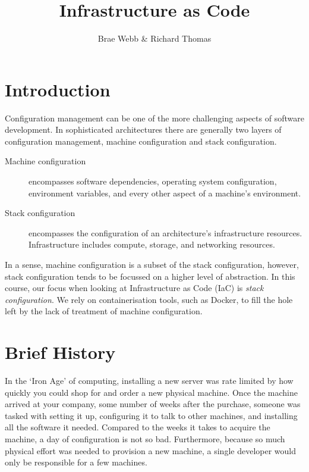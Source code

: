 \title{Infrastructure as Code}
\author{Brae Webb \& Richard Thomas}
\date{}

\maketitle

\section{Introduction}
Configuration management can be one of the more challenging aspects of software development.
In sophisticated architectures there are generally two layers of configuration management,
machine configuration and stack configuration.

\begin{description}
    \item[Machine configuration] encompasses software dependencies, operating system configuration, environment variables,
    and every other aspect of a machine's environment.
    \item[Stack configuration] encompasses the configuration of an architecture's infrastructure resources.
    Infrastructure includes compute, storage, and networking resources.
\end{description}

In a sense, machine configuration is a subset of the stack configuration, however,
stack configuration tends to be focussed on a higher level of abstraction.
In this course, our focus when looking at Infrastructure as Code (IaC) is \textit{stack configuration}.
We rely on containerisation tools, such as Docker, to fill the hole left by the lack of treatment of machine configuration.


\section{Brief History}
In the `Iron Age' of computing, installing a new server was rate limited by how quickly you could shop for and order a new physical machine.
Once the machine arrived at your company,
some number of weeks after the purchase,
someone was tasked with setting it up,
configuring it to talk to other machines,
and installing all the software it needed.
Compared to the weeks it takes to acquire the machine,
a day of configuration is not so bad.
Furthermore, because so much physical effort was needed to provision a new machine,
a single developer would only be responsible for a few machines.

